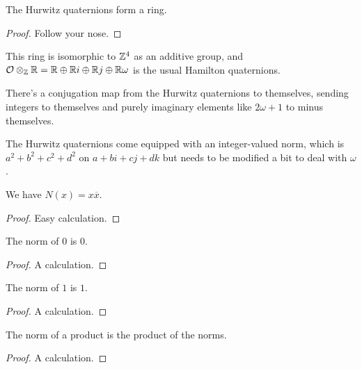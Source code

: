 \begin{lemma}
    \label{Hurwitz.ring}
    \leanok
    The Hurwitz quaternions form a ring.
\end{lemma}
\begin{proof} Follow your nose.
\end{proof}


This ring is isomorphic to $\mathbb{Z}^4$ as an additive group, and
$\mathcal{O}\otimes_{\mathbb{Z}}\mathbb{R}=\mathbb{R}\oplus \mathbb{R} i\oplus \mathbb{R} j\oplus\mathbb{R} \omega$
is the usual Hamilton quaternions.

\begin{definition}
    \label{Hurwitz.conj}
    There's a conjugation map from the Hurwitz quaternions to themselves, sending
    integers to themselves and purely imaginary elements like $2\omega+1$ to minus themselves.
\end{definition}

\begin{definition}
    \label{Hurwitz.norm}
    The Hurwitz quaternions come equipped with an integer-valued norm, which is
    $a^2+b^2+c^2+d^2$ on $a+bi+cj+dk$ but needs to be modified a bit to deal with $\omega$.
\end{definition}

\begin{lemma}
    \label{Hurwitz.norm_eq_mul_conj}
    \leanok
    We have $N(x)=x\overline{x}$.
\end{lemma}
\begin{proof} Easy calculation.
\end{proof}

\begin{lemma}
    \label{Hurwitz.norm_zero}
    \leanok
    The norm of $0$ is $0$.
\end{lemma}
\begin{proof} A calculation.
\end{proof}

\begin{lemma}
    \label{Hurwitz.norm_one}
    \leanok
    The norm of $1$ is $1$.
\end{lemma}
\begin{proof} A calculation.
\end{proof}

\begin{lemma}
    \label{Hurwitz.norm_mul}
    \leanok
    The norm of a product is the product of the norms.
\end{lemma}
\begin{proof} A calculation.
\end{proof}

